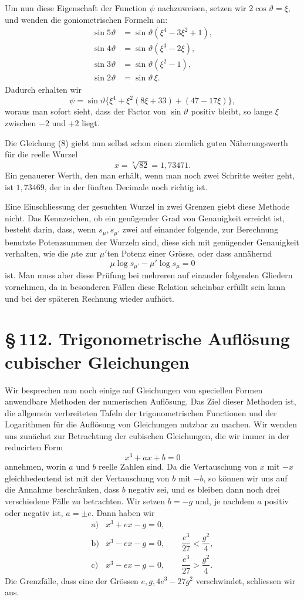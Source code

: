\documentclass[11pt]{article}
\providecommand{\sect}[2]{\section*{\S\,#1. #2}}
\begin{document}
Um nun diese Eigenschaft der Function $\psi$ nachzuweisen, setzen wir $2\cos\vartheta=\xi$, und wenden die goniometrischen Formeln an:
\[
\begin{aligned}
\sin5\vartheta&=\sin\vartheta(\xi^4-3\xi^2+1),\\
\sin4\vartheta&=\sin\vartheta(\xi^3-2\xi),\\
\sin3\vartheta&=\sin\vartheta(\xi^2-1),\\
\sin2\vartheta&=\sin\vartheta\,\xi.
\end{aligned}
\]
Dadurch erhalten wir
\[
        \psi=\sin\vartheta\{\xi^4+\xi^2(8\xi+33)+(47-17\xi)\},
\]
woraus man sofort sieht, dass der Factor von $\sin\vartheta$ positiv bleibt, so lange $\xi$ zwischen $-2$ und $+2$ liegt.

Die Gleichung (8) giebt nun selbst schon einen ziemlich guten Näherungswerth für die reelle Wurzel
\[
        x=\sqrt[8]{82}=1{,}73471.
\]
Ein genauerer Werth, den man erhält, wenn man noch zwei Schritte weiter geht, ist $1{,}73469$, der in der fünften Decimale noch richtig ist.

Eine Einschliessung der gesuchten Wurzel in zwei Grenzen giebt diese Methode nicht. Das Kennzeichen, ob ein genügender Grad von Genauigkeit erreicht ist, besteht darin, dass, wenn $s_\mu,s_{\mu'}$ zwei auf einander folgende, zur Berechnung benutzte Potenzsummen der Wurzeln sind, diese sich mit genügender Genauigkeit verhalten, wie die $\mu$te zur $\mu'$ten Potenz einer Grösse, oder dass annähernd
\[
        \mu\log s_{\mu'}-\mu'\log s_\mu=0
\]
ist. Man muss aber diese Prüfung bei mehreren auf einander folgenden Gliedern vornehmen, da in besonderen Fällen diese Relation scheinbar erfüllt sein kann und bei der späteren Rechnung wieder aufhört.

\sect{112}{Trigonometrische Auflösung cubischer Gleichungen}

Wir besprechen nun noch einige auf Gleichungen von speciellen Formen anwendbare Methoden der numerischen Auflösung. Das Ziel dieser Methoden ist, die allgemein verbreiteten Tafeln der trigonometrischen Functionen und der Logarithmen für die Auflösung von Gleichungen nutzbar zu machen. Wir wenden uns zunächst zur Betrachtung der cubischen Gleichungen, die wir immer in der reducirten Form
\begin{equation}
        x^3+ax+b=0
\tag{1}
\end{equation}
annehmen, worin $a$ und $b$ reelle Zahlen sind. Da die Vertauschung von $x$ mit $-x$ gleichbedeutend ist mit der Vertauschung von $b$ mit $-b$, so können wir uns auf die Annahme beschränken, dass $b$ negativ sei, und es bleiben dann noch drei verschiedene Fälle zu betrachten. Wir setzen $b=-g$ und, je nachdem $a$ positiv oder negativ ist, $a=\pm e$. Dann haben wir
\[
\begin{array}{ll}
\mathrm{a)}&x^3+ex-g=0,\\[0.2em]
\mathrm{b)}&x^3-ex-g=0,\qquad \dfrac{e^3}{27}<\dfrac{g^2}{4},\\[0.5em]
\mathrm{c)}&x^3-ex-g=0,\qquad \dfrac{e^3}{27}>\dfrac{g^2}{4}.
\end{array}
\]
Die Grenzfälle, dass eine der Grössen $e,g,4e^3-27g^2$ verschwindet, schliessen wir aus.
\end{document}
